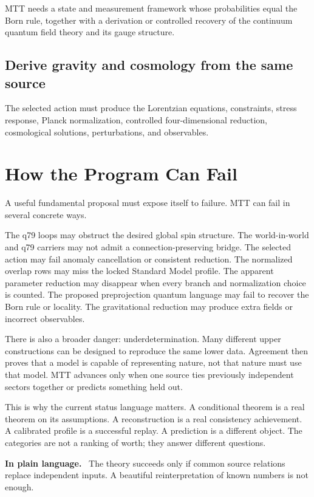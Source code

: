 \documentclass[11pt,openany]{book}
\newenvironment{plainsummary}
  {\par\small\noindent\textbf{In plain language.}\ }
  {\par}
\begin{document}
MTT needs a state and measurement framework whose probabilities equal the
Born rule, together with a derivation or controlled recovery of the continuum
quantum field theory and its gauge structure.

\section*{Derive gravity and cosmology from the same source}

The selected action must produce the Lorentzian equations, constraints,
stress response, Planck normalization, controlled four-dimensional
reduction, cosmological solutions, perturbations, and observables.

\chapter{How the Program Can Fail}

A useful fundamental proposal must expose itself to failure. MTT can fail in
several concrete ways.

The q79 loops may obstruct the desired global spin structure. The
world-in-world and q79 carriers may not admit a connection-preserving bridge.
The selected action may fail anomaly cancellation or consistent reduction.
The normalized overlap rows may miss the locked Standard Model profile. The
apparent parameter reduction may disappear when every branch and
normalization choice is counted. The proposed preprojection quantum language
may fail to recover the Born rule or locality. The gravitational reduction
may produce extra fields or incorrect observables.

There is also a broader danger: underdetermination. Many different upper
constructions can be designed to reproduce the same lower data. Agreement
then proves that a model is capable of representing nature, not that nature
must use that model. MTT advances only when one source ties previously
independent sectors together or predicts something held out.

This is why the current status language matters. A conditional theorem is a
real theorem on its assumptions. A reconstruction is a real consistency
achievement. A calibrated profile is a successful replay. A prediction is a
different object. The categories are not a ranking of worth; they answer
different questions.

\begin{plainsummary}
The theory succeeds only if common source relations replace independent
inputs. A beautiful reinterpretation of known numbers is not enough.
\end{plainsummary}
\end{document}
